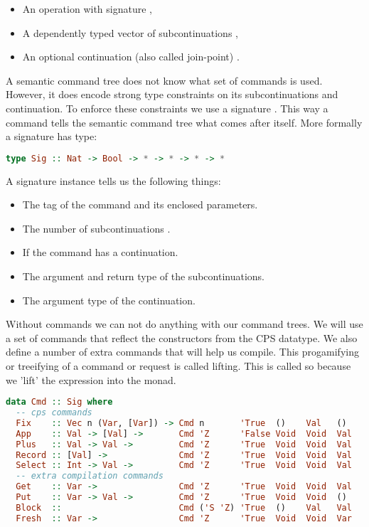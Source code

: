 \begin{itemize}
\item An operation  with signature ,
\item A dependently typed vector of subcontinuations ,
\item An optional continuation (also called join-point) .
\end{itemize}

A semantic command tree does not know what set of commands is used. However, it does encode strong type constraints on its subcontinuations and continuation. To enforce these constraints we use a signature . This way a command tells the semantic command tree what comes after itself. More formally a signature has type:

\begin{lstlisting}[language=Haskell]
type Sig :: Nat -> Bool -> * -> * -> * -> *
\end{lstlisting}

A signature instance  tells us the following things:

\begin{itemize}
\item The tag of the command and its enclosed parameters.
\item The number of subcontinuations .
\item If the command has a continuation.
\item The argument  and return type  of the subcontinuations.
\item The argument type  of the continuation.
\end{itemize}

Without commands we can not do anything with our command trees. We will use a set of commands that reflect the constructors from the \ac{CPS} datatype. We also define a number of extra commands that will help us compile. This progamifying or treeifying of a command or request is called lifting. This is called so because we 'lift' the expression into the monad.

\begin{lstlisting}[language=Haskell]
data Cmd :: Sig where
  -- cps commands
  Fix    :: Vec n (Var, [Var]) -> Cmd n       'True  ()    Val   ()
  App    :: Val -> [Val] ->       Cmd 'Z      'False Void  Void  Val 
  Plus   :: Val -> Val ->         Cmd 'Z      'True  Void  Void  Val
  Record :: [Val] ->              Cmd 'Z      'True  Void  Void  Val
  Select :: Int -> Val ->         Cmd 'Z      'True  Void  Void  Val
  -- extra compilation commands
  Get    :: Var ->                Cmd 'Z      'True  Void  Void  Val
  Put    :: Var -> Val ->         Cmd 'Z      'True  Void  Void  ()
  Block  ::                       Cmd ('S 'Z) 'True  ()    Val   Val
  Fresh  :: Var ->                Cmd 'Z      'True  Void  Void  Var
\end{lstlisting}

